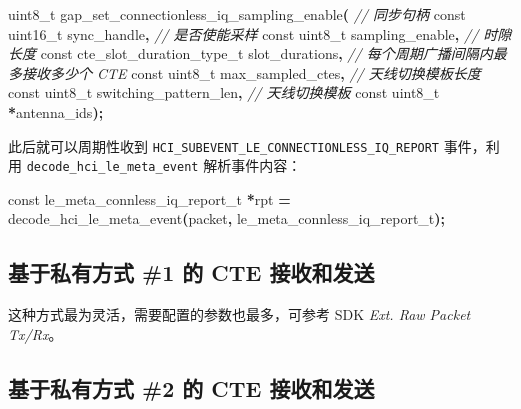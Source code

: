 \documentclass[
  12pt,
]{book}
\newenvironment{Shaded}{\begin{snugshade}}{\end{snugshade}}
\newcommand{\CommentTok}[1]{\textcolor[rgb]{0.56,0.35,0.01}{\textit{#1}}}
\newcommand{\DataTypeTok}[1]{\textcolor[rgb]{0.13,0.29,0.53}{#1}}
\newcommand{\NormalTok}[1]{#1}
\newcommand{\OperatorTok}[1]{\textcolor[rgb]{0.81,0.36,0.00}{\textbf{#1}}}
\begin{document}
\begin{Shaded}
\begin{Highlighting}[]
\DataTypeTok{uint8\_t}\NormalTok{ gap\_set\_connectionless\_iq\_sampling\_enable}\OperatorTok{(}
  \CommentTok{// 同步句柄}
  \DataTypeTok{const} \DataTypeTok{uint16\_t}\NormalTok{      sync\_handle}\OperatorTok{,}
  \CommentTok{// 是否使能采样}
  \DataTypeTok{const} \DataTypeTok{uint8\_t}\NormalTok{       sampling\_enable}\OperatorTok{,}
  \CommentTok{// 时隙长度}
  \DataTypeTok{const}\NormalTok{ cte\_slot\_duration\_type\_t slot\_durations}\OperatorTok{,}
  \CommentTok{// 每个周期广播间隔内最多接收多少个 CTE}
  \DataTypeTok{const} \DataTypeTok{uint8\_t}\NormalTok{       max\_sampled\_ctes}\OperatorTok{,}
  \CommentTok{// 天线切换模板长度}
  \DataTypeTok{const} \DataTypeTok{uint8\_t}\NormalTok{       switching\_pattern\_len}\OperatorTok{,}
  \CommentTok{// 天线切换模板}
  \DataTypeTok{const} \DataTypeTok{uint8\_t}      \OperatorTok{*}\NormalTok{antenna\_ids}\OperatorTok{);}
\end{Highlighting}
\end{Shaded}

此后就可以周期性收到 \texttt{HCI\_SUBEVENT\_LE\_CONNECTIONLESS\_IQ\_REPORT} 事件，利用 \texttt{decode\_hci\_le\_meta\_event}
解析事件内容：

\begin{Shaded}
\begin{Highlighting}[]
\DataTypeTok{const}\NormalTok{ le\_meta\_connless\_iq\_report\_t }\OperatorTok{*}\NormalTok{rpt }\OperatorTok{=}
\NormalTok{  decode\_hci\_le\_meta\_event}\OperatorTok{(}\NormalTok{packet}\OperatorTok{,}\NormalTok{ le\_meta\_connless\_iq\_report\_t}\OperatorTok{);}
\end{Highlighting}
\end{Shaded}

\hypertarget{ux57faux4e8eux79c1ux6709ux65b9ux5f0f-1-ux7684-cte-ux63a5ux6536ux548cux53d1ux9001}{%
\subsection{基于私有方式 \#1 的 CTE 接收和发送}\label{ux57faux4e8eux79c1ux6709ux65b9ux5f0f-1-ux7684-cte-ux63a5ux6536ux548cux53d1ux9001}}

这种方式最为灵活，需要配置的参数也最多，可参考 SDK \emph{Ext. Raw Packet Tx/Rx}。

\hypertarget{ux57faux4e8eux79c1ux6709ux65b9ux5f0f-2-ux7684-cte-ux63a5ux6536ux548cux53d1ux9001}{%
\subsection{基于私有方式 \#2 的 CTE 接收和发送}\label{ux57faux4e8eux79c1ux6709ux65b9ux5f0f-2-ux7684-cte-ux63a5ux6536ux548cux53d1ux9001}}
\end{document}
